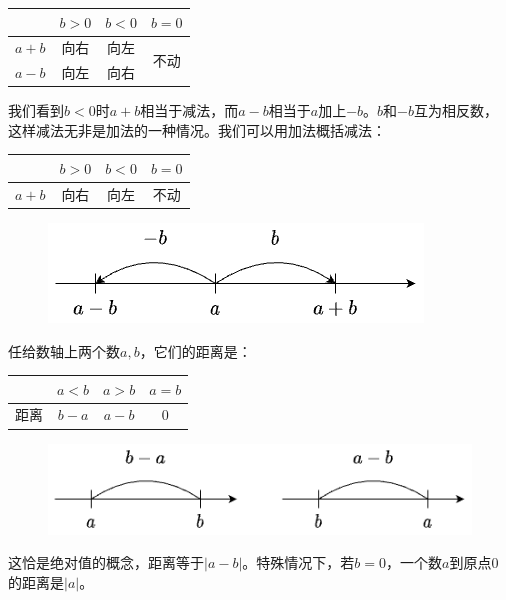 \documentclass[b5paper]{ctexart}
\begin{document}
\begin{center}
  \begin{tabular}{c|c|c|c}
          & $b > 0$ & $b < 0$ & $b = 0$ \\
  \hline
  $a + b$ & 向右     & 向左    & \multirow{2}{*}{不动} \\
  \cline{1-3}
  $a - b$ & 向左     & 向右
  \end{tabular}
\end{center}

我们看到$b < 0$时$a + b$相当于减法，而$a - b$相当于$a$加上$-b$。$b$和$-b$互为相反数，这样减法无非是加法的一种情况。我们可以用加法概括减法：

\begin{center}
\begin{tabular}{c|c|c|c}
        & $b > 0$ & $b < 0$ & $b = 0$ \\
\hline
$a + b$ & 向右     & 向左    & 不动
\end{tabular}
\end{center}

\begin{figure}[htbp]
 \centering
 \includegraphics[scale=0.45]{img/translate}
\end{figure}

任给数轴上两个数$a, b$，它们的距离是：

\begin{center}
  \begin{tabular}{c|c|c|c}
      & $a < b$ & $a > b$ & $a = b$ \\
  \hline
  距离 & $b - a$ & $a - b$ & $0$
  \end{tabular}
\end{center}

\begin{figure}[htbp]
 \centering
 \includegraphics[scale=0.4]{img/distance}
\end{figure}

这恰是绝对值的概念，距离等于$|a - b|$。特殊情况下，若$b = 0$，一个数$a$到原点0的距离是$|a|$。
\end{document}
